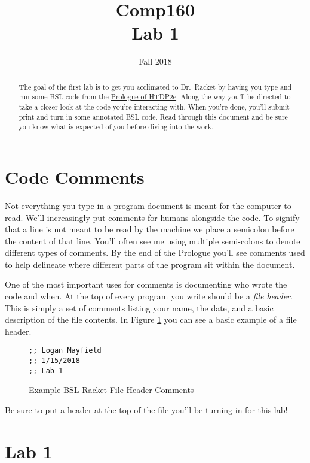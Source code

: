 \documentclass[nobib]{tufte-handout}
\title{Comp160 \\ Lab 1 }
\author{}
\date{ Fall 2018 }
\begin{document}
\maketitle

\begin{abstract}
The goal of the first lab is to get you acclimated to Dr.\ Racket by having you type and run some BSL code from the \href{http://htdp.org/2018-01-06/Book/part_prologue.html}{Prologue of HTDP2e}. Along the way you'll be directed to take a closer look at the code you're interacting with. When you're done, you'll submit print and turn in some annotated BSL code. Read through this document and be sure you know what is expected of you before diving into the work.
\end{abstract}

\section{Code Comments}

Not everything you type in a program document is meant for the computer to read. We'll increasingly put comments for humans alongside the code. To signify that a line is not meant to be read by the machine we place a semicolon before the content of that line. You'll often see me using multiple semi-colons to denote different types of comments.  By the end of the Prologue you'll see comments used to help delineate where different parts of the program sit within the document.

One of the most important uses for comments is documenting who wrote the code and when. At the top of every program you write should be a \textit{file header}. This is simply a set of comments listing your name, the date, and a basic description of the file contents. In Figure \ref{fig1} you can see a basic example of a file header.

\begin{figure}
\begin{lstlisting}
;; Logan Mayfield
;; 1/15/2018
;; Lab 1
\end{lstlisting}
\caption{Example BSL Racket File Header Comments}
\label{fig1}
\end{figure}

Be sure to put a header at the top of the file you'll be turning in for this lab!

\section{Lab 1}
\end{document}
